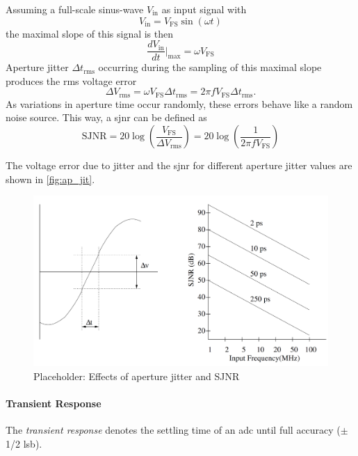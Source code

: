 Assuming a full-scale sinus-wave $V_{\text{in}}$ as input signal with 
\begin{equation}
	V_{\text{in}} = V_{\text{FS}} \sin (\omega t)
\end{equation}
the maximal slope of this signal is then
\begin{equation}
	\frac{dV_{\text{in}}}{dt}\Bigr|_{\text{max}} = \omega V_{\text{FS}}
\end{equation}
Aperture jitter $\Delta t_{\text{rms}}$ occurring during the sampling of this maximal slope produces the \gls{rms} voltage error 
\begin{equation}
	\Delta V_{\text{rms}} = \omega  V_{\text{FS}} \Delta t_{\text{rms}} = 2 \pi f  V_{\text{FS}} \Delta t_{\text{rms}}.
\end{equation}
As variations in aperture time occur randomly, these errors behave like a random noise source. This way, a \gls{sjnr} can be defined as
\begin{equation}
	\text{SJNR} = 20 \log \left( \frac{V_{\text{FS}}}{\Delta V_{\text{rms}}} \right) = 20 \log \left( \frac{1}{2 \pi f  V_{\text{FS}}} \right)
\end{equation}

The voltage error due to jitter and the \gls{sjnr} for different aperture jitter values are shown in \autoref{fig:ap_jit}.

\begin{figure}[tbh]
	\centering
	\includegraphics[width = \textwidth]{chap/02-theory/img/ap_jit}
	\caption{Placeholder: Effects of aperture jitter and SJNR \cite{Lundberg}}
	\label{fig:ap_jit}
\end{figure}

\paragraph{Transient Response}
The \textit{transient response} denotes the settling time of an \gls{adc} until full accuracy ($\pm$ 1/2 \gls{lsb}).


